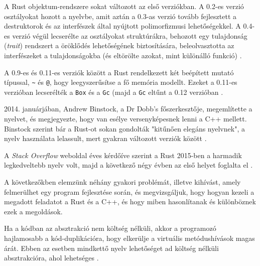 A Rust objektum-rendszere sokat változott az első verziókban. A 0.2-es verzió osztályokat hozott a nyelvbe, amit aztán a 0.3-as verzió tovább fejlesztett a destruktorok és az interfészek által nyújtott polimorfizmusi lehetőségekkel.
A 0.4-es verzió végül lecserélte az osztályokat struktúrákra, behozott egy tulajdonság (\textit{trait}) rendszert a öröklődés lehetőségének biztosítására, 
beleolvasztotta az interfészeket a tulajdonságokba (és eltörölte azokat, mint különálló funkció) \cite{rust:version_history}.

A 0.9-es és 0.11-es verziók között a Rust rendelkezett két beépített mutató típussal, \texttt{\~} és \texttt{@}, hogy leegyszerűsítse a fő memória modellt.
Ezeket a 0.11-es verzióban lecserélték a \texttt{Box} és a \texttt{Gc} (majd a \texttt{Gc} eltűnt a 0.12 verzióban \cite{rust:version_history}.

2014. januárjában, Andrew Binstock, a Dr Dobb's főszerkesztője, megemlítette a nyelvet, és megjegyezte, hogy van esélye versenyképesnek lenni a C++ mellett.
Binstock szerint bár a Rust-ot sokan gondolták "kitűnően elegáns nyelvnek", a nyelv használata lelassult, mert gyakran változott verziók között \cite{dr_dobb}.

A \textit{Stack Overflow} weboldal éves kérdőíve szerint a Rust 2015-ben a harmadik legkedveltebb nyelv volt, majd a következő négy évben az első helyet foglalta el \cite{so_2015, so_2016, so_2017, so_2018, so_2019}.


A következőkben elemzünk néhány gyakori problémát, illetve kihívást, amely felmerülhet egy program fejlesztése során,
és megvizsgáljuk, hogy hogyan kezeli a megadott feladatot a Rust és a C++, és hogy miben hasonlítanak és különböznek ezek a megoldások.


Ha a kódban az absztrakció nem költség nélküli, akkor a programozó hajlamosabb a kód-duplikációra, hogy elkerülje a virtuális metódushívások magas árát.
Ebben az esetben mindkettő nyelv lehetőséget ad költség nélküli absztrakcióra, ahol lehetséges \cite{compare:cpp:zerocost, compare:rust:zerocost}.


\label{subsec:ownership_mentioned}


